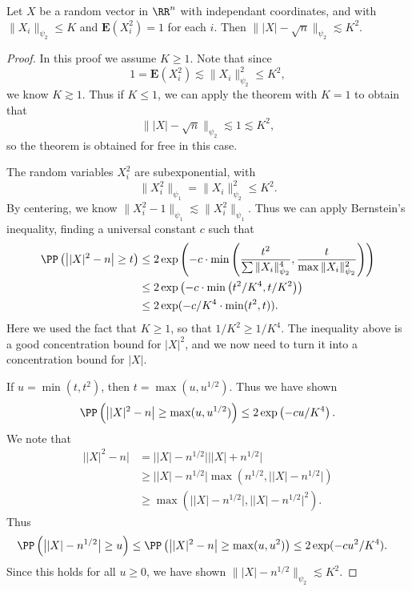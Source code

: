 \begin{theorem} \label{concentrationNorm}
    Let $X$ be a random vector in $\RR^n$ with independant coordinates, and with $\| X_i \|_{\psi_2} \leq K$ and $\mathbf{E}(X_i^2) = 1$ for each $i$. Then $\| |X| - \sqrt{n} \|_{\psi_2} \lesssim K^2$.
\end{theorem}
\begin{proof}
    In this proof we assume $K \geq 1$. Note that since
    \[ 1 = \mathbf{E}(X_i^2) \lesssim \| X_i \|_{\psi_2}^2 \leq K^2, \]
    we know $K \gtrsim 1$. Thus if $K \leq 1$, we can apply the theorem with $K = 1$ to obtain that
    \[ \| |X| - \sqrt{n} \|_{\psi_2} \lesssim 1 \lesssim K^2, \]
    so the theorem is obtained for free in this case.

    The random variables $X_i^2$ are subexponential, with
    \[ \| X_i^2 \|_{\psi_1} = \| X_i \|_{\psi_2}^2 \leq K^2. \]
    By centering, we know $\| X_i^2 - 1 \|_{\psi_1} \lesssim \| X_i^2 \|_{\psi_1}$. Thus we can apply Bernstein's inequality, finding a universal constant $c$ such that
    \begin{align*}
        \PP \left( \big||X|^2 - n \big| \geq t \right) &\leq 2 \exp \left( -c \cdot \min \left( \frac{t^2}{\sum \| X_i \|_{\psi_2}^4}, \frac{t}{\max \| X_i \|_{\psi_2}^2} \right) \right)\\
        &\leq 2 \exp \left( -c \cdot \min \left( t^2 / K^4 , t/K^2 \right) \right)\\
        &\leq 2 \exp(-c/K^4 \cdot \min(t^2,t)).
    \end{align*}
    Here we used the fact that $K \geq 1$, so that $1/K^2 \geq 1/K^4$. The inequality above is a good concentration bound for $|X|^2$, and we now need to turn it into a concentration bound for $|X|$.

    If $u = \min(t,t^2)$, then $t = \max(u,u^{1/2})$. Thus we have shown
    \[ \PP \left( \big||X|^2 - n \big| \geq \max(u,u^{1/2}) \right) \leq 2 \exp \left( - cu/K^4 \right). \]
    We note that
    \begin{align*}
        \big||X|^2 - n \big| &= \big||X| - n^{1/2} \big| \big||X| + n^{1/2} \big|\\
        &\geq \big| |X| - n^{1/2} \big| \max \left(n^{1/2}, \big| |X| - n^{1/2} \big| \right)\\
        &\geq \max \left( \big| |X| - n^{1/2} \big|, \big| |X| - n^{1/2} \big|^2 \right).
    \end{align*}
    Thus
    \begin{align*}
        \PP \left( \big| |X| - n^{1/2} \big| \geq u \right) &\leq \PP \left( \big| |X|^2 - n \big| \geq \max(u,u^2) \right) \leq 2 \exp(-cu^2/K^4).
    \end{align*}
    Since this holds for all $u \geq 0$, we have shown $\| |X| - n^{1/2} \|_{\psi_2} \lesssim K^2$.
\end{proof}

